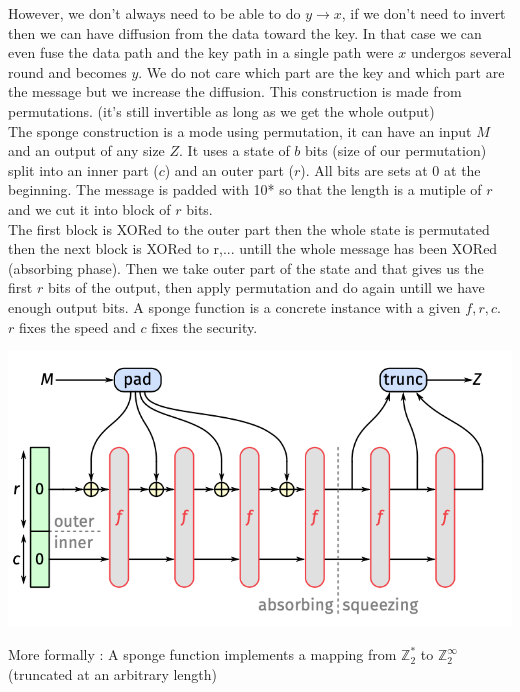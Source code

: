 \documentclass[11pt,a4paper]{report}
\begin{document}
However, we don't always need to be able to do $y \rightarrow x$, if we don't need to invert then we can have diffusion from the data toward the key. In that case we can even fuse the data path and the key path in a single path were $x$ undergos several round and becomes $y$. We do not care which part are the key and which part are the message but we increase the diffusion. This construction is made from permutations. (it's still invertible as long as we get the whole output)\\

The sponge construction is a mode using permutation, it can have an input $M$ and an output of any size $Z$. It uses a state of $b$ bits (size of our permutation) split into an inner part ($c$) and an outer part ($r$). All bits are sets at 0 at the beginning. The message is padded with 10* so that the length is a mutiple of $r$ and we cut it into block of $r$ bits.\\
The first block is XORed to the outer part then the whole state is permutated then the next block is XORed to r,... untill the whole message has been XORed (absorbing phase). Then we take outer part of the state and that gives us the first $r$ bits of the output, then apply permutation and do again untill we have enough output bits. A sponge function is a concrete instance with a given $f,r,c$.\\
$r$ fixes the speed and $c$ fixes the security.
\begin{center}
\includegraphics[scale=0.6]{img/img14.png}
\end{center}
More formally : A sponge function implements a mapping from $\mathbb{Z}_2^*$ to $\mathbb{Z}_2^{\infty}$ (truncated at an arbitrary length)\\
\end{document}
